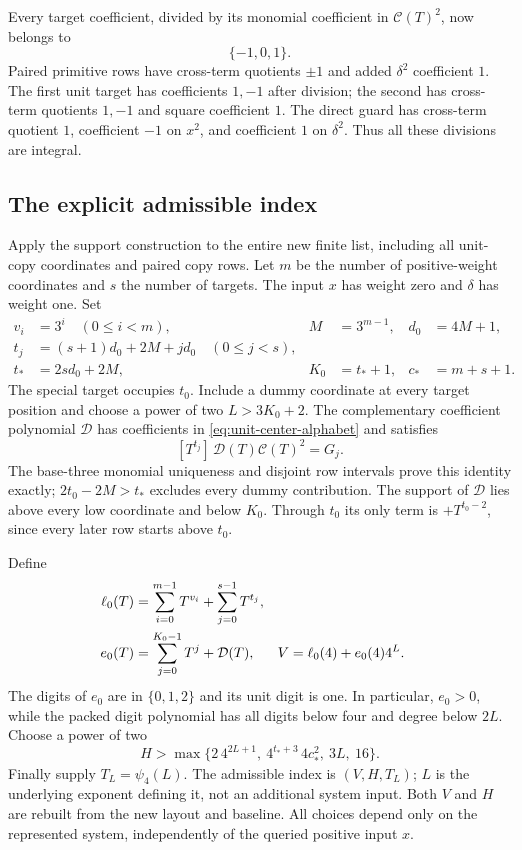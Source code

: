 Every target coefficient, divided by its monomial coefficient in
$\mathcal C(T)^2$, now belongs to
\begin{equation}\label{eq:unit-center-alphabet}
 \{-1,0,1\}.
\end{equation}
Paired primitive rows have cross-term quotients $\pm1$ and added
$\delta^2$ coefficient $1$. The first unit target has coefficients
$1,-1$ after division; the second has cross-term quotients $1,-1$
and square coefficient $1$. The direct guard has cross-term quotient
$1$, coefficient $-1$ on $x^2$, and coefficient $1$ on $\delta^2$.
Thus all these divisions are integral.

\subsection{The explicit admissible index}

Apply the support construction to the entire new finite list,
including all unit-copy coordinates and paired copy rows. Let $m$
be the number of positive-weight coordinates and $s$ the number of
targets. The input $x$ has weight zero and $\delta$ has weight one.
Set
\begin{align*}
 v_i&=3^i\quad(0\le i<m),& M&=3^{m-1},& d_0&=4M+1,\\
 t_j&=(s+1)d_0+2M+jd_0\quad(0\le j<s),\\
 t_*&=2sd_0+2M,& K_0&=t_*+1,&c_*&=m+s+1.
\end{align*}
The special target occupies $t_0$. Include a dummy coordinate at
every target position and choose a power of two $L>3K_0+2$.
The complementary coefficient polynomial $\mathcal D$ has
coefficients in \eqref{eq:unit-center-alphabet} and satisfies
\[
 [T^{t_j}]\,\mathcal D(T)\mathcal C(T)^2=G_j.
\]
The base-three monomial uniqueness and disjoint row intervals prove
this identity exactly; $2t_0-2M>t_*$ excludes every dummy contribution.
The support of $\mathcal D$ lies above every low coordinate and
below $K_0$. Through $t_0$ its only term is $+T^{t_0-2}$, since
every later row starts above $t_0$.

Define
\begin{align}
 \ell_0(T)&=\sum_{i=0}^{m-1}T^{v_i}+\sum_{j=0}^{s-1}T^{t_j},\notag\\
 e_0(T)&=\sum_{j=0}^{K_0-1}T^j+\mathcal D(T),&
 V&=\ell_0(4)+e_0(4)4^L.\label{eq:unit-center-index}
\end{align}
The digits of $e_0$ are in $\{0,1,2\}$ and its unit digit is one.
In particular, $e_0>0$, while the packed digit polynomial has all
digits below four and degree below $2L$. Choose a power of two
\begin{equation}\label{eq:unit-center-H}
 H>\max\{2\,4^{2L+1},\ 4^{t_*+3}\,4c_*^2,\ 3L,\ 16\}.
\end{equation}
Finally supply $T_L=\psi_4(L)$. The admissible index is
$(V,H,T_L)$; $L$ is the underlying exponent defining it, not an
additional system input. Both $V$ and $H$ are rebuilt from the new
layout and baseline. All choices depend only on the represented
system, independently of the queried positive input $x$.


